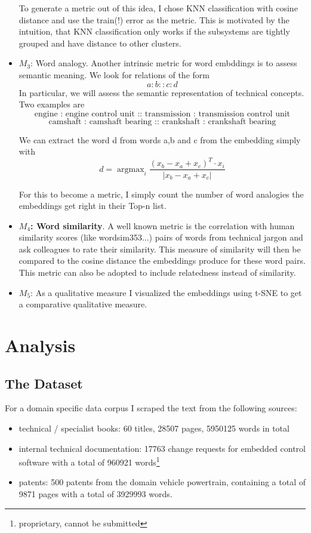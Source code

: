 \documentclass[10pt,a4paper]{article}
\DeclareMathOperator*{\argmax}{argmax} %
\begin{document}
\begin{itemize}
		To generate a metric out of this idea, I chose KNN classification with cosine distance and use the train(!) error as the metric. This is motivated by the intuition, that KNN classification only works if the subsystems are tightly grouped and have distance to other clusters. 

		
		\item \textbf{$M_3$}: Word analogy. Another intrinsic metric for word embddings is to assess semantic meaning. We look for relations of the form
		$$ a:b::c:d $$
		In particular, we will assess the semantic representation of technical concepts. Two examples are 
		$$\text{engine : engine control unit :: transmission : transmission control unit}$$
		$$\text{camshaft : camshaft bearing :: crankshaft : crankshaft bearing}$$
		
		We can extract the word d from words a,b and c from the embedding simply with
		\begin{equation}
		d=\argmax_{i} \frac{(x_b -x_a + x_c)^T\cdot x_i}{|x_b-x_a+x_c|}
		\end{equation}
		
		For this to become a metric, I simply count the number of word analogies the embeddings get right in their Top-n list. 
		
		
		
		\item \textbf{$M_4$: Word similarity}. A well known metric is the correlation with human similarity scores (like wordsim353...) pairs of words from technical jargon and ask colleagues to rate their similarity. This measure of similarity will then be compared to the cosine distance the embeddings produce for these word pairs. This metric can also be adopted to include relatedness instead of similarity.
		
		\item \textbf{$M_5$}: As a qualitative measure I visualized the embeddings using t-SNE \cite{vanDerMaaten2008} to get a comparative qualitative measure.
		
	\end{itemize}
	
	\section{Analysis}
	\subsection{The Dataset}
	
	For a domain specific data corpus I scraped the text from the following sources:
	\begin{itemize}
		\item technical / specialist books: 60 titles, 28507 pages, 5950125 words in total 
		\item internal technical documentation: 17763 change requests for embedded control software with a total of 960921 words\footnote{proprietary, cannot be submitted} 
		\item patents: 500 patents from the domain vehicle powertrain, containing a total of 9871 pages with a total of 3929993 words.
	\end{itemize}
	
\end{document}
